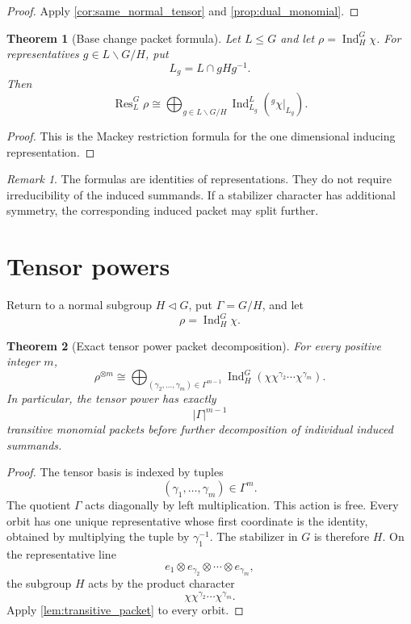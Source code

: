 \documentclass{aomart}
\newtheorem{theorem}{Theorem}[section]
\theoremstyle{definition}
\theoremstyle{remark}
\newtheorem{remark}[remark]{Remark}
\newcommand{\Ind}{\operatorname{Ind}}
\newcommand{\Res}{\operatorname{Res}}
\newcommand{\abs}[1]{\left\lvert#1\right\rvert}
\begin{document}
\begin{proof}
Apply \cref{cor:same_normal_tensor} and \cref{prop:dual_monomial}.
\end{proof}

\begin{theorem}[Base change packet formula]\label{thm:base_change_mackey}
Let \(L\leq G\) and let \(\rho=\Ind_H^G\chi\). For representatives \(g\in L\backslash G/H\), put
\[
L_g=L\cap gHg^{-1}.
\]
Then
\[
\boxed{
\Res_L^G\rho
\cong
\bigoplus_{g\in L\backslash G/H}
\Ind_{L_g}^L
\left({}^g\chi|_{L_g}\right).
}
\]
\end{theorem}

\begin{proof}
This is the Mackey restriction formula for the one dimensional inducing representation.
\end{proof}

\begin{remark}\label{rem:mackey_scope}
The formulas are identities of representations. They do not require irreducibility of the induced summands. If a stabilizer character has additional symmetry, the corresponding induced packet may split further.
\end{remark}

\section{Tensor powers}\label{sec:tensorpowers}

Return to a normal subgroup \(H\triangleleft G\), put \(\Gamma=G/H\), and let
\[
\rho=\Ind_H^G\chi.
\]

\begin{theorem}[Exact tensor power packet decomposition]\label{thm:tensor_power}
For every positive integer \(m\),
\[
\boxed{
\rho^{\otimes m}
\cong
\bigoplus_{(\gamma_2,\ldots,\gamma_m)\in\Gamma^{m-1}}
\Ind_H^G
\left(
\chi\chi^{\gamma_2}\cdots\chi^{\gamma_m}
\right).
}
\]
In particular, the tensor power has exactly
\[
\abs\Gamma^{m-1}
\]
transitive monomial packets before further decomposition of individual induced summands.
\end{theorem}

\begin{proof}
The tensor basis is indexed by tuples
\[
(\gamma_1,\ldots,\gamma_m)\in\Gamma^m.
\]
The quotient \(\Gamma\) acts diagonally by left multiplication. This action is free. Every orbit has one unique representative whose first coordinate is the identity, obtained by multiplying the tuple by \(\gamma_1^{-1}\). The stabilizer in \(G\) is therefore \(H\). On the representative line
\[
e_1\otimes e_{\gamma_2}\otimes\cdots\otimes e_{\gamma_m},
\]
the subgroup \(H\) acts by the product character
\[
\chi\chi^{\gamma_2}\cdots\chi^{\gamma_m}.
\]
Apply \cref{lem:transitive_packet} to every orbit.
\end{proof}
\end{document}
